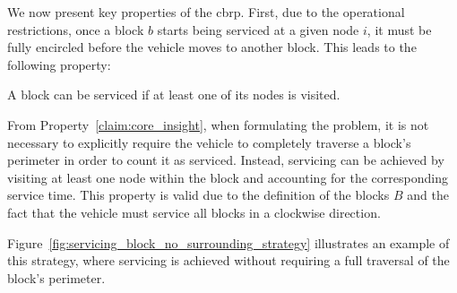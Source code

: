 We now present key properties of the \gls{cbrp}. First, due to the operational
restrictions, once a block $b$ starts being serviced at a given node $i$, it
must be fully encircled before the vehicle moves to another block. This leads to
the following property:

\begin{property}
	\label{claim:core_insight}
	A block can be serviced if at least one of its nodes is visited.
\end{property}

From Property~\ref{claim:core_insight}, when formulating the problem, it is not
necessary to explicitly require the vehicle to completely traverse a block's
perimeter in order to count it as serviced. Instead, servicing can be achieved
by visiting at least one node within the block and accounting for the
corresponding service time. This property is valid due to the definition of the
blocks $B$ and the fact that the vehicle must service all blocks in a clockwise
direction.

Figure~\ref{fig:servicing_block_no_surrounding_strategy} illustrates an example
of this strategy, where servicing is achieved without requiring a full traversal
of the block's perimeter.

